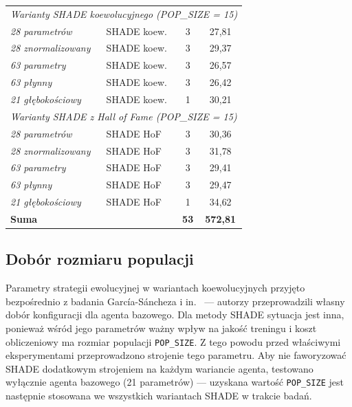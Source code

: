\begin{table}[p]
\begin{tabular}{llcc}
\midrule
\multicolumn{4}{l}{\textit{Warianty SHADE koewolucyjnego (POP\_SIZE = 15)}} \\
\hspace{1em}\textit{28 parametrów}      & SHADE koew. & 3 & 27,81 \\
\hspace{1em}\textit{28 znormalizowany}  & SHADE koew. & 3 & 29,37 \\
\hspace{1em}\textit{63 parametry}       & SHADE koew. & 3 & 26,57 \\
\hspace{1em}\textit{63 płynny}          & SHADE koew. & 3 & 26,42 \\
\hspace{1em}\textit{21 głębokościowy}   & SHADE koew. & 1 & 30{,}21 \\
\midrule
\multicolumn{4}{l}{\textit{Warianty SHADE z Hall of Fame (POP\_SIZE = 15)}} \\
\hspace{1em}\textit{28 parametrów}      & SHADE HoF & 3 & 30{,}36 \\
\hspace{1em}\textit{28 znormalizowany}  & SHADE HoF & 3 & 31{,}78 \\
\hspace{1em}\textit{63 parametry}       & SHADE HoF & 3 & 29{,}41 \\
\hspace{1em}\textit{63 płynny}          & SHADE HoF & 3 & 29{,}47 \\
\hspace{1em}\textit{21 głębokościowy}   & SHADE HoF & 1 & 34{,}62 \\
\midrule
\textbf{Suma} & & \textbf{53} & \textbf{572,81} \\
\bottomrule
\end{tabular}
\end{table}

\subsection{Dobór rozmiaru populacji} \label{sec:popsize_tuning}

Parametry strategii ewolucyjnej w wariantach koewolucyjnych przyjęto bezpośrednio z badania García-Sáncheza i in.~\cite{sanchez2020} --- autorzy przeprowadzili własny dobór konfiguracji dla agenta bazowego. Dla metody SHADE sytuacja jest inna, ponieważ wśród jego parametrów ważny wpływ na jakość treningu i koszt obliczeniowy ma rozmiar populacji \texttt{POP\_SIZE}. Z tego powodu przed właściwymi eksperymentami przeprowadzono strojenie tego parametru. Aby nie faworyzować SHADE dodatkowym strojeniem na każdym wariancie agenta, testowano wyłącznie agenta bazowego (21 parametrów) --- uzyskana wartość \texttt{POP\_SIZE} jest następnie stosowana we wszystkich wariantach SHADE w trakcie badań.

